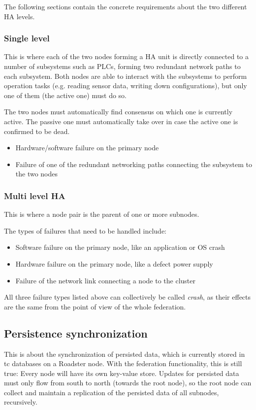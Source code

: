 The following sections contain the concrete requirements about the two
different \gls{HA} levels.

\subsubsection{Single level}
This is where each of the two nodes forming a HA unit is directly connected to a number of
subsystems such as \glspl{PLC}, forming two redundant network paths to each
subsystem. Both nodes are able to interact with the subsystems to perform
operation tasks (e.g. reading sensor data, writing down configurations), but
only one of them (the active one) must do so.

The two nodes must automatically find consensus on which one is currently active. The
passive one must automatically take over in case the active one is confirmed to
be dead.
\begin{itemize}
	\item Hardware/software failure on the primary node %
	\item Failure of one of the redundant networking paths connecting the subsystem to the two nodes %
\end{itemize}

\subsubsection{Multi level HA}
This is where a node pair is the parent of one or more subnodes.

The types of failures that need to be handled include:
\begin{itemize}
	\item Software failure on the primary node, like an application or OS crash
	\item Hardware failure on the primary node, like a defect power supply
	\item Failure of the network link connecting a node to the cluster
\end{itemize}

All three failure types listed above can collectively be called \emph{crash},
as their effects are the same from the point of view of the whole federation.

\subsection{Persistence synchronization}
This is about the synchronization of persisted data, which is currently stored
in \gls{tc} databases on a Roadster node. With the federation functionality, this is
still true: Every node will have its own key-value store. Updates for persisted
data must only flow from south to north (towards the root node), so the root
node can collect and maintain a replication of the persisted data of all
subnodes, recursively.

